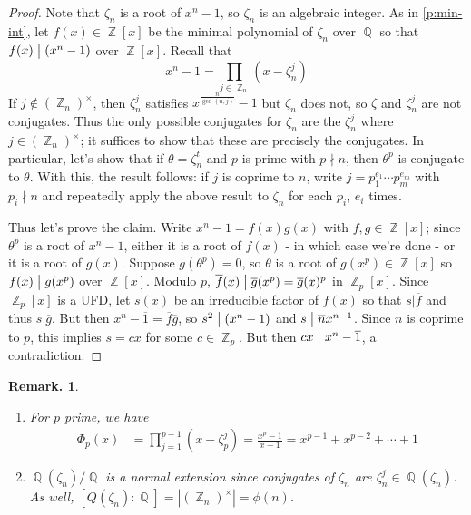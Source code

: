 \documentclass[11pt, a4paper]{memoir}
\DeclareMathOperator{\Q}{{\mathbb{Q}}}
\DeclareMathOperator{\Z}{{\mathbb{Z}}}
\renewcommand{\div}{\bigm|}
\newcommand{\ol}[1]{\ensuremath{\overline{#1}}}
\theoremstyle{change}
\theoremstyle{plain}
\theoremstyle{nonumberplain}
\newtheorem{remark}{Remark.}
\newtheorem{proof}{Proof}
\numberwithin{equation}{section}
\begin{document}
\begin{proof}
    Note that $\zeta_n$ is a root of $x^n-1$, so $\zeta_n$ is an algebraic integer.
    As in \cref{p:min-int}, let $f(x)\in\Z[x]$ be the minimal polynomial of $\zeta_n$ over $\Q$ so that $f(x)\div(x^n-1)$ over $\Z[x]$.
    Recall that
    \begin{equation*}
        x^n-1=\prod\limits_{j\in\Z_n}(x-\zeta_n^j)
    \end{equation*}
    If $j\notin(\Z_n)^\times$, then $\zeta_n^j$ satisfies $x^{\frac{n}{\gcd(n,j)}}-1$ but $\zeta_n$ does not, so $\zeta$ and $\zeta_n^j$ are not conjugates.
    Thus the only possible conjugates for $\zeta_n$ are the $\zeta_n^j$ where $j\in(\Z_n)^\times$; it suffices to show that these are precisely the conjugates.
    In particular, let's show that if $\theta=\zeta_n^t$ and $p$ is prime with $p\nmid n$, then $\theta^p$ is conjugate to $\theta$.
    With this, the result follows: if $j$ is coprime to $n$, write $j=p_1^{e_1}\cdots p_m^{e_m}$ with $p_i\nmid n$ and repeatedly apply the above result to $\zeta_n$ for each $p_i$, $e_i$ times.

    Thus let's prove the claim.
    Write $x^n-1=f(x)g(x)$ with $f,g\in\Z[x]$; since $\theta^p$ is a root of $x^n-1$, either it is a root of $f(x)$ - in which case we're done - or it is a root of $g(x)$.
    Suppose $g(\theta^p)=0$, so $\theta$ is a root of $g(x^p)\in\Z[x]$ so $f(x)\div g(x^p)$ over $\Z[x]$.
    Modulo $p$, $\ol{f}(x)\div\ol{g}(x^p)=\ol{g}(x)^p$ in $\Z_p[x]$.
    Since $\Z_p[x]$ is a UFD, let $s(x)$ be an irreducible factor of $f(x)$ so that $s|\ol{f}$ and thus $s|\ol{g}$.
    But then $x^{n}-\ol{1}=\ol{f}\ol{g}$, so $s^2\div(x^n-1)$ and $s\div\ol{n}x^{n-1}$.
    Since $n$ is coprime to $p$, this implies $s=cx$ for some $c\in\Z_p$.
    But then $cx\div x^n-\ol{1}$, a contradiction.
\end{proof}
\begin{remark}
    \begin{enumerate}[nl]
        \item For $p$ prime, we have
            \begin{align*}
                \Phi_p(x) &= \prod\limits_{j=1}^{p-1}(x-\zeta_p^j)= \frac{x^p-1}{x-1}= x^{p-1}+x^{p-2}+\cdots+1
            \end{align*}
        \item $\Q(\zeta_n)/\Q$ is a normal extension since conjugates of $\zeta_n$ are $\zeta_n^j\in\Q(\zeta_n)$.
            As well, $[Q(\zeta_n):\Q]=|(\Z_n)^\times|=\phi(n)$.
    \end{enumerate}
\end{remark}
\end{document}
